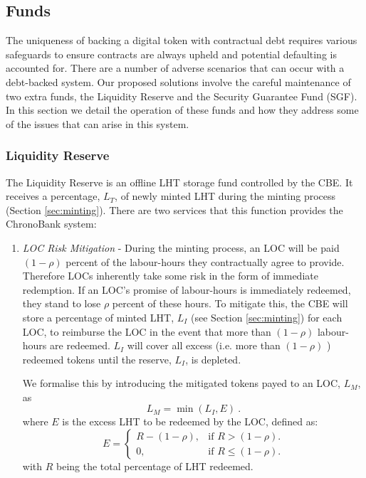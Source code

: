 \begin{multicols}{2}
\subsection{Funds}
\label{sec:funds}

The uniqueness of backing a digital token with contractual debt requires various safeguards to ensure contracts are always upheld and potential defaulting is accounted for. There are a number of adverse scenarios that can occur with a debt-backed system. Our proposed solutions involve the careful maintenance of two extra funds, the Liquidity Reserve and the Security Guarantee Fund (SGF). In this section we detail the operation of these funds and how they address some of the issues that can arise in this system. 

\subsubsection{Liquidity Reserve}
\label{sec:liquidity}

The Liquidity Reserve is an offline LHT storage fund controlled by the CBE. It receives a percentage, $L_T$, of newly minted LHT during the minting process (Section \ref{sec:minting}). There are two services that this function provides the ChronoBank system: 

\begin{enumerate}
	\item \textit{LOC Risk Mitigation} - During the minting process, an LOC will be paid $(1-\rho)$ percent of the labour-hours they contractually agree to provide. Therefore LOCs inherently take some risk in the form of immediate redemption. If an LOC's promise of labour-hours is immediately redeemed, they stand to lose $\rho$ percent of these hours. To mitigate this, the CBE will store a percentage of minted LHT, $L_I$ (see Section \ref{sec:minting}) for each LOC, to reimburse the LOC in the event that more than $(1-\rho)$ labour-hours are redeemed. $L_I$ will cover all excess (i.e. more than $(1-\rho)$ ) redeemed tokens until the reserve, $L_I$, is depleted. 

We formalise this by introducing the mitigated tokens payed to an LOC, $L_M$, as
\begin{equation}
	L_M = \min(L_I,E) ~.
  \label{eq:redeemed}
\end{equation}
where $E$ is the excess LHT to be redeemed by the LOC, defined as: 
\begin{equation}
  E = \begin{cases} 
    R - (1 -\rho) , & \text{if $R > (1 - \rho)$}. \\
    0,  & \text{if $R \le (1- \rho)$}. 
  \end{cases}
  \label{eq:E}
\end{equation}
with $R$ being the total percentage of LHT redeemed.


\end{enumerate}
\end{multicols}
